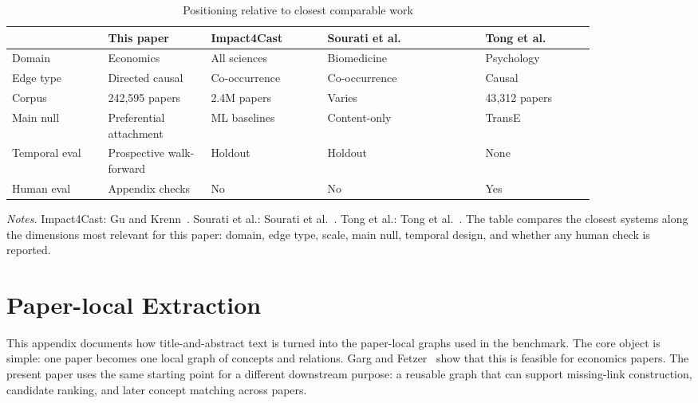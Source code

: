\documentclass[11pt]{article}
\newcommand{\fignotes}[1]{\caption*{\textit{Notes.} #1}}
\begin{document}
\begin{table}[t]
  \caption{Positioning relative to closest comparable work}
  \label{tab:positioning}
  \centering
  \small
  \begin{tabular}{L{0.14\linewidth}L{0.15\linewidth}L{0.17\linewidth}L{0.23\linewidth}L{0.16\linewidth}}
    \toprule
    & This paper & Impact4Cast & Sourati et al. & Tong et al. \\
    \midrule
    Domain & Economics & All sciences & Biomedicine & Psychology \\
    Edge type & Directed causal & Co-occurrence & Co-occurrence & Causal \\
    Corpus & 242{,}595 papers & 2.4M papers & Varies & 43{,}312 papers \\
    Main null & Preferential attachment & ML baselines & Content-only & TransE \\
    Temporal eval & Prospective walk-forward & Holdout & Holdout & None \\
    Human eval & Appendix checks & No & No & Yes \\
    \bottomrule
  \end{tabular}
  \fignotes{Impact4Cast: Gu and Krenn~\citeyearpar{gu2025impact4cast}. Sourati et al.: Sourati et al.~\citeyearpar{sourati2023accelerating}. Tong et al.: Tong et al.~\citeyearpar{tong2024automating}. The table compares the closest systems along the dimensions most relevant for this paper: domain, edge type, scale, main null, temporal design, and whether any human check is reported.}
\end{table}





\section{Paper-local Extraction}
\label{app:extraction-protocol}

This appendix documents how title-and-abstract text is turned into the paper-local graphs
used in the benchmark. The core object is simple: one paper becomes one local graph of
concepts and relations. Garg and Fetzer~\citeyearpar{gargfetzer2025causal} show that this is
feasible for economics papers. The present paper uses the same starting point for a
different downstream purpose: a reusable graph that can support missing-link construction,
candidate ranking, and later concept matching across papers.
\end{document}
